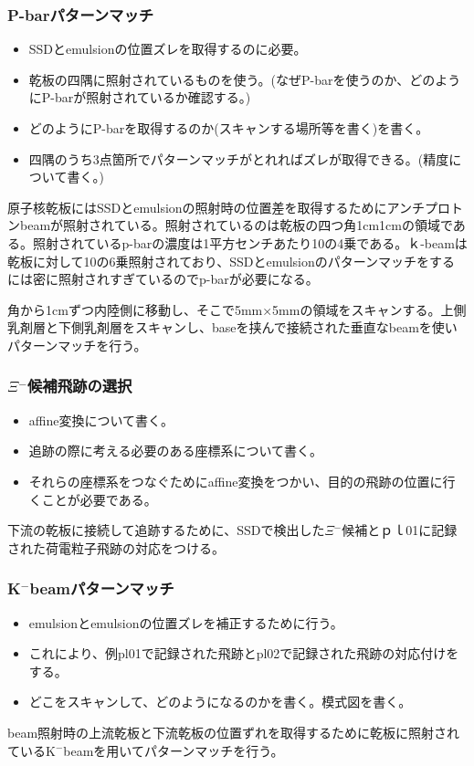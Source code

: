 \documentclass[12pt,a4paper]{jarticle}
\begin{document}
\subsubsection{P-barパターンマッチ}
\begin{itemize}
    \item SSDとemulsionの位置ズレを取得するのに必要。
    \item 乾板の四隅に照射されているものを使う。(なぜP-barを使うのか、どのようにP-barが照射されているか確認する。)
    \item どのようにP-barを取得するのか(スキャンする場所等を書く)を書く。
    \item 四隅のうち3点箇所でパターンマッチがとれればズレが取得できる。(精度について書く。)
\end{itemize}
原子核乾板にはSSDとemulsionの照射時の位置差を取得するためにアンチプロトンbeamが照射されている。照射されているのは乾板の四つ角1cm1cmの領域である。照射されているp-barの濃度は1平方センチあたり10の4乗である。ｋ-beamは乾板に対して10の6乗照射されており、SSDとemulsionのパターンマッチをするには密に照射されすぎているのでp-barが必要になる。\par
角から1cmずつ内陸側に移動し、そこで5mm×5mmの領域をスキャンする。上側乳剤層と下側乳剤層をスキャンし、baseを挟んで接続された垂直なbeamを使いパターンマッチを行う。\par
\subsubsection{$\Xi$$^-$候補飛跡の選択}
\begin{itemize}
    \item affine変換について書く。
    \item 追跡の際に考える必要のある座標系について書く。
    \item それらの座標系をつなぐためにaffine変換をつかい、目的の飛跡の位置に行くことが必要である。
\end{itemize}
下流の乾板に接続して追跡するために、SSDで検出した$\Xi$$^-$候補とｐｌ01に記録された荷電粒子飛跡の対応をつける。
\subsubsection{K$^-$beamパターンマッチ}
\begin{itemize}
    \item emulsionとemulsionの位置ズレを補正するために行う。
    \item これにより、例pl01で記録された飛跡とpl02で記録された飛跡の対応付けをする。
    \item どこをスキャンして、どのようになるのかを書く。模式図を書く。
\end{itemize}
beam照射時の上流乾板と下流乾板の位置ずれを取得するために乾板に照射されているK$^-$beamを用いてパターンマッチを行う。
\end{document}
